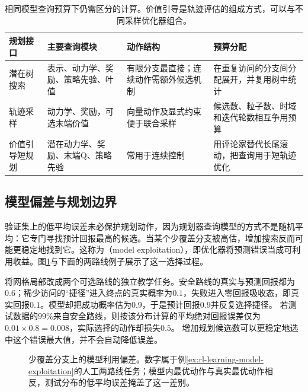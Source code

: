 \begin{table}[t]
  \centering
  \small
  \begin{tabularx}{\linewidth}{>{\raggedright\arraybackslash}p{23mm} >{\raggedright\arraybackslash}X >{\raggedright\arraybackslash}X >{\raggedright\arraybackslash}X}
    \toprule
    规划接口 & 主要查询模块 & 动作结构 & 预算分配 \\
    \midrule
    潜在树搜索 & 表示、动力学、奖励、策略先验、叶值 & 有限分支最直接；连续动作需额外候选机制 & 在重复访问的分支间分配展开，并复用树中统计 \\
    轨迹采样 & 动力学、奖励，可选末端价值 & 向量动作及显式约束便于联合采样 & 候选数、粒子数、时域和迭代轮数相互争用预算 \\
    价值引导短规划 & 潜在动力学、奖励、末端Q、策略先验 & 常用于连续控制 & 用评论家替代长尾滚动，把查询用于短轨迹优化 \\
    \bottomrule
  \end{tabularx}
  \caption{相同模型查询预算下仍需区分的计算。价值引导是轨迹评估的组成方式，可以与不同采样优化器组合。}
  \label{tab:rl-learning-planning-budgets}
\end{table}

\subsection{模型偏差与规划边界}
\label{sec:rl-learning-model-bias}

验证集上的低平均误差未必保护规划动作，因为规划器查询模型的方式不是随机平均：它专门寻找预计回报最高的候选。当某个少覆盖分支被高估，增加搜索反而可能更稳定地找到它。这称为（model exploitation），即优化器将预测错误当成可利用收益。图\ref{fig:rl-learning-model-exploitation}与下面的两路线例子展示了这一选择过程。

\begin{example}[优化器选择了最乐观的错误]
  \label{ex:rl-learning-model-exploitation}
  将网格局部改成两个可选路线的独立教学任务。安全路线的真实与预测回报都为$0.6$；稀少访问的“捷径”进入终点的真实概率为$0.1$，失败进入零回报吸收态，即真实回报$0.1$。模型却把成功概率估为$0.9$，于是预计回报$0.9$并反复选择捷径。
  若测试数据的$99\%$来自安全路线，则按该分布计算的平均绝对回报误差仅为$0.01\times0.8=0.008$，实际选择的动作却损失$0.5$。
  增加规划候选数可以更稳定地选中这个错误最大值，并不会自动降低误差。
\end{example}

\begin{figure}[htbp]
  \centering
  
  \caption{少覆盖分支上的模型利用偏差。数字属于例\ref{ex:rl-learning-model-exploitation}的人工两路线任务；模型内最优动作与真实最优动作相反，测试分布的低平均误差掩盖了这一差别。}
  \label{fig:rl-learning-model-exploitation}
\end{figure}

